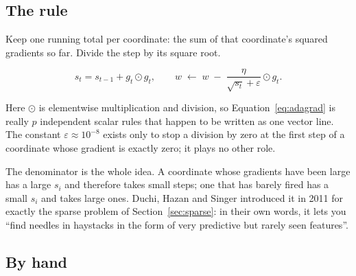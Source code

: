 \documentclass[11pt]{article}
\begin{document}
\subsection{The rule}

Keep one running total per coordinate: the sum of that coordinate's squared
gradients so far. Divide the step by its square root.

\begin{equation}
  \label{eq:adagrad}
  s_t = s_{t-1} + g_t \odot g_t,
  \qquad
  w \;\leftarrow\; w \;-\; \frac{\eta}{\sqrt{s_t} + \varepsilon} \odot g_t .
\end{equation}

Here $\odot$ is elementwise multiplication and division, so
Equation~\eqref{eq:adagrad} is really $p$ independent scalar rules that happen
to be written as one vector line. The constant $\varepsilon \approx 10^{-8}$
exists only to stop a division by zero at the first step of a coordinate whose
gradient is exactly zero; it plays no other role.

The denominator is the whole idea. A coordinate whose gradients have been large
has a large $s_i$ and therefore takes small steps; one that has barely fired
has a small $s_i$ and takes large ones. Duchi, Hazan and Singer introduced it
in 2011 for exactly the sparse problem of Section~\ref{sec:sparse}: in their
own words, it lets you ``find needles in haystacks in the form of very
predictive but rarely seen features''.

\subsection{By hand}
\end{document}
